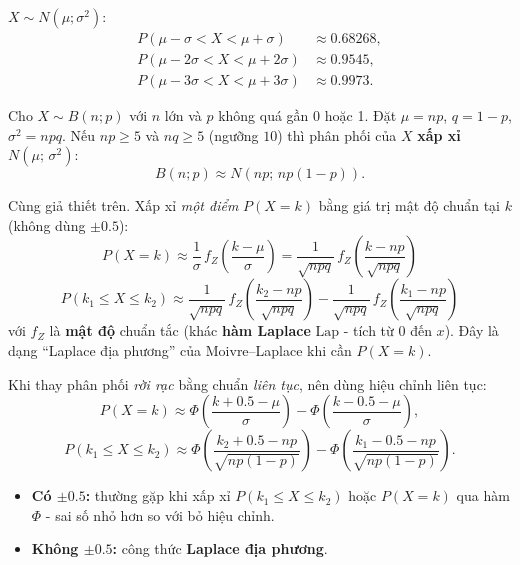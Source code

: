 \documentclass[12pt,a4paper]{article}
\begin{document}
\begin{luuy}[title={Nhận xét}]
  $X \sim N(\mu;\sigma^2)$:
  \begin{align*}
    P(\mu - \sigma < X < \mu + \sigma) &\approx 0.68268, \\
    P(\mu - 2\sigma < X < \mu + 2\sigma) &\approx 0.9545, \\
    P(\mu - 3\sigma < X < \mu + 3\sigma) &\approx 0.9973.
  \end{align*}
\end{luuy}

\begin{dinhly}[title={Xấp xỉ nhị thức bởi phân phối chuẩn (Định lý Moivre--Laplace)}]
  Cho $X \sim B(n;p)$ với $n$ lớn và $p$ không quá gần 0 hoặc 1. Đặt $\mu = np$, $q = 1-p$, $\sigma^2 = npq$.
  Nếu $np \ge 5$ và $nq \ge 5$ (ngưỡng $10$) thì phân phối của $X$ \textbf{xấp xỉ} $N(\mu;\,\sigma^2)$:
  \[
    B(n;p) \approx N(np;\, np(1-p)).
  \]
\end{dinhly}

\begin{dinhly}[title={Công thức Laplace địa phương}]
  Cùng giả thiết trên. Xấp xỉ \emph{một điểm} $P(X = k)$ bằng giá trị mật độ chuẩn tại $k$ (không dùng $\pm 0.5$):
  \[
    P(X = k) \approx \dfrac{1}{\sigma}\, f_Z\!\left(\dfrac{k-\mu}{\sigma}\right)
    = \dfrac{1}{\sqrt{npq}}\, f_Z\!\left(\dfrac{k-np}{\sqrt{npq}}\right)
  \]
  \[
    P(k_1 \le X \le k_2) \approx \dfrac{1}{\sqrt{npq}}\, f_Z\!\left(\dfrac{k_2 - np}{\sqrt{npq}}\right) - \dfrac{1}{\sqrt{npq}}\, f_Z\!\left(\dfrac{k_1 - np}{\sqrt{npq}}\right)
  \]
  với $f_Z$ là \textbf{mật độ} chuẩn tắc (khác \textbf{hàm Laplace} $\mathrm{Lap}$ - tích từ $0$ đến $x$). Đây là dạng ``Laplace địa phương'' của Moivre--Laplace khi cần $P(X=k)$.
\end{dinhly}

\begin{dinhly}[title={Xấp xỉ qua $\Phi$ và hiệu chỉnh liên tục $\pm 0.5$}]
  Khi thay phân phối \emph{rời rạc} bằng chuẩn \emph{liên tục}, nên dùng hiệu chỉnh liên tục:
  \[
    P(X = k) \approx \Phi\!\left(\dfrac{k + 0.5 - \mu}{\sigma}\right) - \Phi\!\left(\dfrac{k - 0.5 - \mu}{\sigma}\right),
  \]
  \[
    P(k_1 \le X \le k_2) \approx \Phi\!\left(\dfrac{k_2 + 0.5 - np}{\sqrt{np(1-p)}}\right) - \Phi\!\left(\dfrac{k_1 - 0.5 - np}{\sqrt{np(1-p)}}\right).
  \]
\end{dinhly}

\begin{luuy}[title={Có hay không hiệu chỉnh $\pm 0.5$?}]
  \begin{itemize}
    \item \textbf{Có $\pm 0.5$:} thường gặp khi xấp xỉ $P(k_1 \le X \le k_2)$ hoặc $P(X=k)$ qua hàm $\Phi$ - sai số nhỏ hơn so với bỏ hiệu chỉnh.
    \item \textbf{Không $\pm 0.5$:} công thức \textbf{Laplace địa phương}.
  \end{itemize}
\end{luuy}
\end{document}
